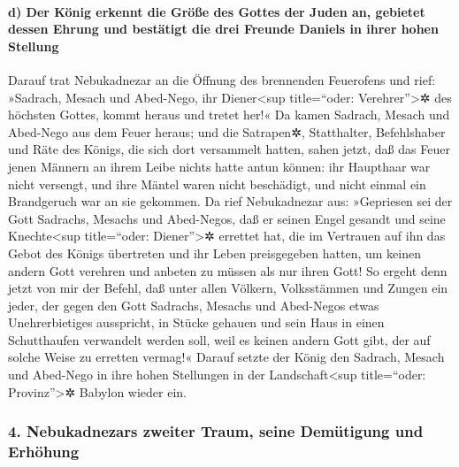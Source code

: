 \hypertarget{d-der-kuxf6nig-erkennt-die-gruxf6uxdfe-des-gottes-der-juden-an-gebietet-dessen-ehrung-und-bestuxe4tigt-die-drei-freunde-daniels-in-ihrer-hohen-stellung}{%
\paragraph{d) Der König erkennt die Größe des Gottes der Juden an,
gebietet dessen Ehrung und bestätigt die drei Freunde Daniels in ihrer
hohen
Stellung}\label{d-der-kuxf6nig-erkennt-die-gruxf6uxdfe-des-gottes-der-juden-an-gebietet-dessen-ehrung-und-bestuxe4tigt-die-drei-freunde-daniels-in-ihrer-hohen-stellung}}

Darauf trat Nebukadnezar an die Öffnung des brennenden
Feuerofens und rief: »Sadrach, Mesach und Abed-Nego, ihr
Diener\textless sup title=``oder: Verehrer''\textgreater✲ des höchsten
Gottes, kommt heraus und tretet her!« Da kamen Sadrach, Mesach und
Abed-Nego aus dem Feuer heraus; und die Satrapen✲,
Statthalter, Befehlshaber und Räte des Königs, die sich dort versammelt
hatten, sahen jetzt, daß das Feuer jenen Männern an ihrem Leibe nichts
hatte antun können: ihr Haupthaar war nicht versengt, und ihre Mäntel
waren nicht beschädigt, und nicht einmal ein Brandgeruch war an sie
gekommen. Da rief Nebukadnezar aus: »Gepriesen sei der
Gott Sadrachs, Mesachs und Abed-Negos, daß er seinen Engel gesandt und
seine Knechte\textless sup title=``oder: Diener''\textgreater✲ errettet
hat, die im Vertrauen auf ihn das Gebot des Königs übertreten und ihr
Leben preisgegeben hatten, um keinen andern Gott verehren und anbeten zu
müssen als nur ihren Gott! So ergeht denn jetzt von mir
der Befehl, daß unter allen Völkern, Volksstämmen und Zungen ein jeder,
der gegen den Gott Sadrachs, Mesachs und Abed-Negos etwas
Unehrerbietiges ausspricht, in Stücke gehauen und sein Haus in einen
Schutthaufen verwandelt werden soll, weil es keinen andern Gott gibt,
der auf solche Weise zu erretten vermag!« Darauf setzte
der König den Sadrach, Mesach und Abed-Nego in ihre hohen Stellungen in
der Landschaft\textless sup title=``oder: Provinz''\textgreater✲ Babylon
wieder ein.

\hypertarget{nebukadnezars-zweiter-traum-seine-demuxfctigung-und-erhuxf6hung}{%
\subsubsection{4. Nebukadnezars zweiter Traum, seine Demütigung und
Erhöhung}\label{nebukadnezars-zweiter-traum-seine-demuxfctigung-und-erhuxf6hung}}


